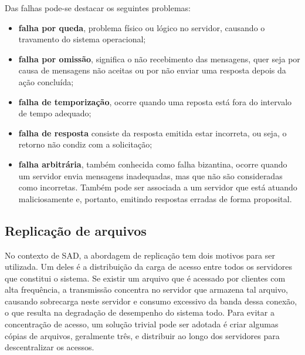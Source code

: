 	Das falhas pode-se destacar os seguintes problemas:
	\begin{itemize}
		\item \textbf{falha por queda}, problema físico ou lógico no servidor, causando o travamento do sistema operacional;
		
		\item \textbf{falha por omissão}, significa o não recebimento das mensagens, quer seja por causa de mensagens não aceitas ou por não enviar uma resposta depois da ação concluída;
		
		\item \textbf{falha de temporização}, ocorre quando uma reposta está fora do intervalo de tempo adequado;
		
		\item \textbf{falha de resposta} consiste da resposta emitida estar incorreta, ou seja, o retorno não condiz com a solicitação;
		
		\item \textbf{falha arbitrária}, também conhecida como falha bizantina, ocorre quando um
		servidor envia mensagens inadequadas, mas que não são consideradas como incorretas.
		Também pode ser associada a um servidor que está atuando maliciosamente
		e, portanto, emitindo respostas erradas de forma proposital.
		
	\end{itemize}
	
	\subsection{Replicação de arquivos}
	No contexto de SAD, a abordagem de replicação tem dois motivos para ser utilizada. 
	Um deles é a distribuição da carga de acesso entre todos os servidores que constitui o sistema. 
	Se existir um arquivo que é acessado por clientes com alta frequência, a transmissão concentra no servidor que armazena tal arquivo, causando sobrecarga neste servidor e consumo excessivo da banda dessa conexão, o que resulta na degradação de desempenho do sistema todo. 
	Para evitar a concentração de acesso, um solução trivial pode ser adotada é criar algumas cópias de arquivos, geralmente três, e distribuir ao longo dos servidores para descentralizar os acessos. \\
	
